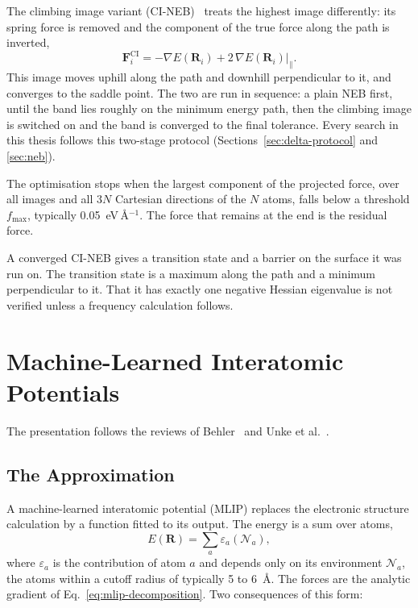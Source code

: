 The climbing image variant (CI-NEB)~\cite{henkelman2000cineb} treats the
highest image differently: its spring force is removed and the component
of the true force along the path is inverted,
%
\begin{equation}
  \mathbf{F}_i^\text{CI} = -\nabla E(\mathbf{R}_i)
  + 2\,\nabla E(\mathbf{R}_i)\big|_\parallel .
\end{equation}
%
This image moves uphill along the path and downhill perpendicular to
it, and converges to the saddle point. The two are run in sequence: a
plain NEB first, until the band lies roughly on the minimum energy
path, then the climbing image is switched on and the band is converged
to the final tolerance. Every search in this thesis follows this
two-stage protocol (Sections~\ref{sec:delta-protocol} and
\ref{sec:neb}).

The optimisation stops when the largest component of the projected force,
over all images and all $3N$ Cartesian directions of the $N$ atoms, falls
below a threshold $f_\text{max}$, typically 0.05~eV\,\AA$^{-1}$. The force
that remains at the end is the residual force.

A converged CI-NEB gives a transition state and a barrier on the surface
it was run on. The transition state is a maximum along the path and a
minimum perpendicular to it. That it has exactly one negative Hessian
eigenvalue is not verified unless a frequency calculation follows.

\section{Machine-Learned Interatomic Potentials}
\label{sec:background-mlip}

The presentation follows the reviews of Behler~\cite{behler2021} and Unke
et al.~\cite{unke2021}.

\subsection{The Approximation}
\label{sec:mlip-approximation}

A machine-learned interatomic potential (MLIP) replaces the electronic
structure calculation by a function fitted to its output. The energy is a
sum over atoms,
%
\begin{equation}
  E(\mathbf{R}) = \sum_a \varepsilon_a(\mathcal{N}_a),
  \label{eq:mlip-decomposition}
\end{equation}
%
where $\varepsilon_a$ is the contribution of atom $a$ and depends only on
its environment $\mathcal{N}_a$, the atoms within a cutoff radius of
typically 5 to 6~\AA. The forces are the analytic gradient of
Eq.~\eqref{eq:mlip-decomposition}. Two consequences of this form:

